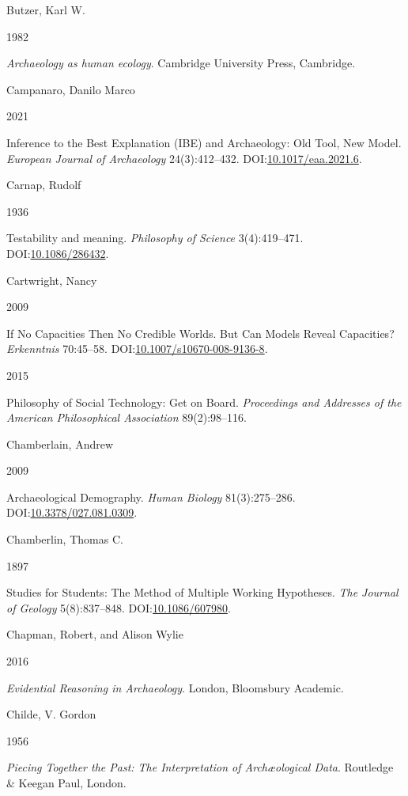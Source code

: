 \documentclass[
  12pt,
  a4paper,
  oneside]{book}
\newlength{\cslhangindent}
\newlength{\csllabelwidth}
\newlength{\cslentryspacingunit} %
\newenvironment{CSLReferences}[2] %
 {%
  \setlength{\parindent}{0pt}
  \ifodd #1
  \let\oldpar\par
  \def\par{\hangindent=\cslhangindent\oldpar}
  \fi
  \setlength{\parskip}{#2\cslentryspacingunit}
 }%
 {}
\newcommand{\CSLBlock}[1]{#1\hfill\break}
\newcommand{\CSLLeftMargin}[1]{\parbox[t]{\csllabelwidth}{#1}}
\newcommand{\CSLRightInline}[1]{\parbox[t]{\linewidth - \csllabelwidth}{#1}\break}
\begin{document}
\begin{CSLReferences}{0}{0}
\leavevmode{}%
\CSLBlock{Butzer, Karl W.}
\CSLLeftMargin{ 1982}
\CSLRightInline{\emph{{Archaeology as human ecology}}. Cambridge University Press, Cambridge.}

\leavevmode{}%
\CSLBlock{Campanaro, Danilo Marco}
\CSLLeftMargin{ 2021}
\CSLRightInline{{Inference to the Best Explanation (IBE) and Archaeology: Old Tool, New Model}. \emph{European Journal of Archaeology} 24(3):412--432. DOI:\href{https://doi.org/10.1017/eaa.2021.6}{10.1017/eaa.2021.6}.}

\leavevmode{}%
\CSLBlock{Carnap, Rudolf}
\CSLLeftMargin{ 1936}
\CSLRightInline{Testability and meaning. \emph{Philosophy of Science} 3(4):419--471. DOI:\href{https://doi.org/10.1086/286432}{10.1086/286432}.}

\leavevmode{}%
\CSLBlock{Cartwright, Nancy}
\CSLLeftMargin{ 2009}
\CSLRightInline{{If No Capacities Then No Credible Worlds. But Can Models Reveal Capacities?} \emph{Erkenntnis} 70:45--58. DOI:\href{https://doi.org/10.1007/s10670-008-9136-8}{10.1007/s10670-008-9136-8}.}

\leavevmode{}%
\CSLLeftMargin{ 2015 }
\CSLRightInline{{Philosophy of Social Technology: Get on Board}. \emph{Proceedings and Addresses of the American Philosophical Association} 89(2):98--116.}

\leavevmode{}%
\CSLBlock{Chamberlain, Andrew}
\CSLLeftMargin{ 2009}
\CSLRightInline{{Archaeological Demography}. \emph{Human Biology} 81(3):275--286. DOI:\href{https://doi.org/10.3378/027.081.0309}{10.3378/027.081.0309}.}

\leavevmode{}%
\CSLBlock{Chamberlin, Thomas C.}
\CSLLeftMargin{ 1897}
\CSLRightInline{{Studies for Students: The Method of Multiple Working Hypotheses}. \emph{The Journal of Geology} 5(8):837--848. DOI:\href{https://doi.org/10.1086/607980}{10.1086/607980}.}

\leavevmode{}%
\CSLBlock{Chapman, Robert, and Alison Wylie}
\CSLLeftMargin{ 2016}
\CSLRightInline{\emph{{Evidential Reasoning in Archaeology}}. London, Bloomsbury Academic.}

\leavevmode{}%
\CSLBlock{Childe, V. Gordon}
\CSLLeftMargin{ 1956}
\CSLRightInline{\emph{{Piecing Together the Past: The Interpretation of Archæological Data}}. Routledge \& Keegan Paul, London.}


\end{CSLReferences}
\end{document}
